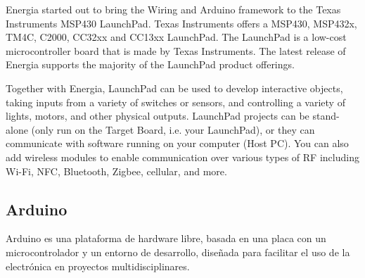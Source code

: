 \documentclass[]{article}
\begin{document}
Energia started out to bring the Wiring and Arduino framework to the Texas Instruments MSP430 LaunchPad. Texas Instruments offers a MSP430, MSP432x, TM4C, C2000, CC32xx and CC13xx LaunchPad. The LaunchPad is a low-cost microcontroller board that is made by Texas Instruments. The latest release of Energia supports the majority of the LaunchPad product offerings.

Together with Energia, LaunchPad can be used to develop interactive objects, taking inputs from a variety of switches or sensors, and controlling a variety of lights, motors, and other physical outputs. LaunchPad projects can be stand-alone (only run on the Target Board, i.e. your LaunchPad), or they can communicate with software running on your computer (Host PC). You can also add wireless modules to enable communication over various types of RF including Wi-Fi, NFC, Bluetooth, Zigbee, cellular, and more.\cite{TX}\\




\subsection{Arduino}

Arduino es una plataforma de hardware libre, basada en una placa con un microcontrolador y un entorno de desarrollo, diseñada para facilitar el uso de la electrónica en proyectos multidisciplinares.\cite{Ard}\\

\end{document}
